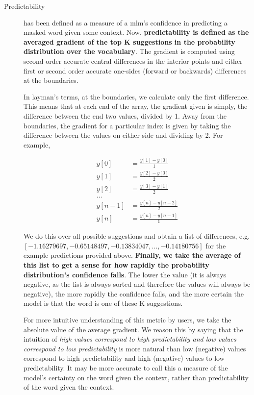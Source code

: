 \begin{description}
    \item[Predictability] has been defined as a measure of a \acrfull{mlm}'s confidence in predicting a masked word given some context. 
        Now, \textbf{predictability is defined as the averaged gradient of the top K suggestions in the probability distribution over the vocabulary}. 
        The gradient is computed using second order accurate central differences in the interior points and either first or second order accurate one-sides (forward or backwards) differences at the boundaries. 
        
        In layman's terms, at the boundaries, we calculate only the first difference. This means that at each end of the array, the gradient given is simply, the difference between the end two values, divided by 1. Away from the boundaries, the gradient for a particular index is given by taking the difference between the values on either side and dividing by 2. For example,

        \begin{align*}
            y[0] &= \frac{y[1] - y[0]}{1} \\
            y[1] &= \frac{y[2] - y[0]}{2} \\
            y[2] &= \frac{y[3] - y[1]}{2} \\
            \dots \\
            y[n-1] &= \frac{y[n] - y[n-2]}{2} \\
            y[n] &= \frac{y[n] - y[n-1]}{1}
        \end{align*}

        We do this over all possible suggestions and obtain a list of differences, e.g. \newline $[-1.16279697, -0.65148497, -0.13834047, \dots, -0.14180756]$ for the example predictions provided above. \textbf{Finally, we take the average of this list to get a sense for how rapidly the probability distribution's confidence falls}. The lower the value (it is always negative, as the list is always sorted and therefore the values will always be negative), the more rapidly the confidence falls, and the more certain the model is that the word is one of these K suggestions. 
        
        For more intuitive understanding of this metric by users, we take the absolute value of the average gradient. We reason this by saying that the intuition of \textit{high values correspond to high predictability and low values correspond to low predictability} is more natural than low (negative) values correspond to high predictability and high (negative) values to low predictability. It may be more accurate to call this a measure of the model's certainty on the word given the context, rather than predictability of the word given the context.



\end{description}
